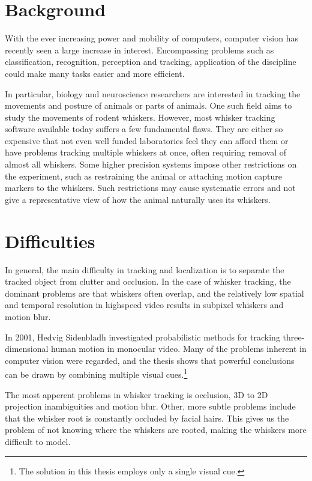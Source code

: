 \section{Background}

With the ever increasing power and mobility of computers, computer vision has recently seen a large increase in interest. 
Encompassing problems such as classification, recognition, perception and tracking, application of the discipline could make many tasks easier and more efficient.

In particular, biology and neuroscience researchers are interested in tracking the movements and posture \cite{WhiskerVideography} of animals or parts of animals.
One such field aims to study the movements of rodent whiskers. However, most whisker tracking software available today suffers a few fundamental flaws.
They are either so expensive that not even well funded laboratories feel they can afford them or have problems tracking multiple whiskers at once, often requiring removal of almost all whiskers. 
Some higher precision systems impose other restrictions on the experiment, such as restraining the animal or attaching motion 
capture markers to the whiskers. \cite{BadExample1} Such restrictions may cause systematic errors and not give 
a representative view of how the animal naturally uses its whiskers.

\section{Difficulties}
In general, the main difficulty in tracking and localization is to separate the tracked object from clutter
and occlusion. In the case of whisker tracking, the dominant problems are that whiskers often overlap, 
and the relatively low spatial and temporal resolution in highspeed
video results in subpixel whiskers and motion blur. \cite{WhiskerVideography}

In 2001, Hedvig Sidenbladh investigated probabilistic methods for
tracking three-dimensional human motion in monocular
video. \cite{Hedvig} Many of the problems inherent in computer vision
were regarded, and the thesis shows that powerful conclusions can be
drawn by combining multiple visual cues.\footnote{The solution in this
thesis employs only a single visual cue.}

The most apperent problems in whisker tracking is occlusion, 3D to 2D
projection inambiguities and motion blur. Other, more subtle problems
include that the whisker root is constantly occluded by facial
hairs. This gives us the problem of not knowing where the whiskers are
rooted, making the whiskers more difficult to model.

